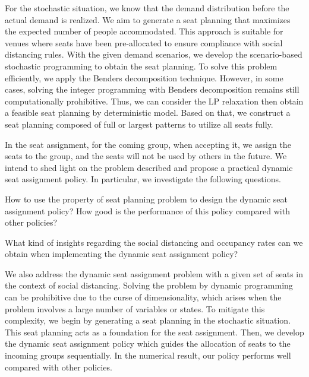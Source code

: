 For the stochastic situation, we know that the demand distribution before the actual demand is realized. We aim to generate a seat planning that maximizes the expected number of people accommodated. This approach is suitable for venues where seats have been pre-allocated to ensure compliance with social distancing rules. With the given demand scenarios, we develop the scenario-based stochastic programming to obtain the seat planning. To solve this problem efficiently, we apply the Benders decomposition technique. However, in some cases, solving the integer programming with Benders decomposition remains still computationally prohibitive. Thus, we can consider the LP relaxation then obtain a feasible seat planning by deterministic model. Based on that, we construct a seat planning composed of full or largest patterns to utilize all seats fully.



In the seat assignment, for the coming group, when accepting it, we assign the seats to the group, and the seats will not be used by others in the future. We intend to shed light on the problem described and propose a practical dynamic seat assignment policy. In particular, we investigate the following questions.

How to use the property of seat planning problem to design the dynamic seat assignment policy? How good is the performance of this policy compared with other policies?

What kind of insights regarding the social distancing and occupancy rates can we obtain when implementing the dynamic seat assignment policy?


We also address the dynamic seat assignment problem with a given set of seats in the context of social distancing. Solving the problem by dynamic programming can be prohibitive due to the curse of dimensionality, which arises when the problem involves a large number of variables or states. To mitigate this complexity, we begin by generating a seat planning in the stochastic situation. This seat planning acts as a foundation for the seat assignment. Then, we develop the dynamic seat assignment policy which guides the allocation of seats to the incoming groups sequentially. In the numerical result, our policy performs well compared with other policies. 


